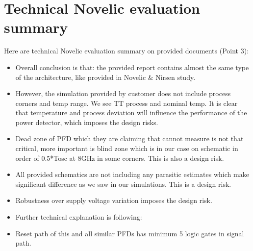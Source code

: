 \documentclass{article}
\begin{document}

\section{Technical Novelic evaluation summary}

Here are technical Novelic evaluation summary on provided documents (Point 3): 

\begin{itemize}
	\item Overall conclusion is that: the provided report contains almost the same type of the architecture, like provided in Novelic \& Nirsen study. 
	\item However, the simulation provided by customer does not include process corners and temp range. We see TT process and nominal temp. It is clear that temperature and process deviation will influence the performance of the power detector, which imposes the design risks. %
	\item Dead zone of PFD which they are claiming that cannot measure is not that critical, more important is blind zone which is in our case on schematic in order of 0.5*Tosc at 8GHz in some corners. This is also a design risk. 
	\item All provided schematics are not including any parasitic estimates which make significant difference as we saw in our simulations. This is a design risk. 
	\item Robustness over supply voltage variation imposes the design risk.
	\item Further technical explanation is following:
	\item Reset path of this and all similar PFDs has minimum 5 logic gates in signal path.
	

\end{itemize}
\end{document}
